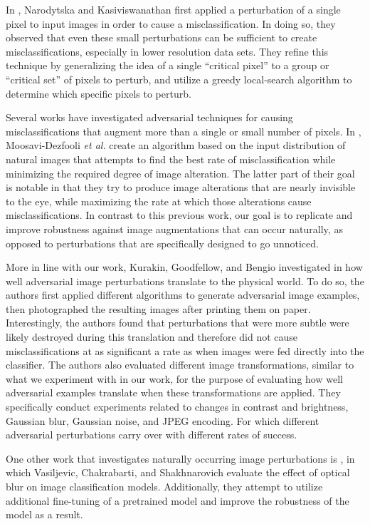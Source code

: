 \documentclass[conference]{IEEEtran}
\begin{document}
In \cite{simpleblackboxpert}, Narodytska and Kasiviswanathan first applied a perturbation of a single pixel to input images in order to cause a misclassification. In doing so, they observed that even these small perturbations can be sufficient to create misclassifications, especially in lower resolution data sets. They refine this technique by generalizing the idea of a single “critical pixel” to a group or “critical set” of pixels to perturb, and utilize a greedy local-search algorithm to determine which specific pixels to perturb.

Several works have investigated adversarial techniques for causing misclassifications that augment more than a single or small number of pixels. In \cite{universaladvpert}, Moosavi-Dezfooli {\it et al.} create an algorithm based on the input distribution of natural images that attempts to find the best rate of misclassification while minimizing the required degree of image alteration. The latter part of their goal is notable in that they try to produce image alterations that are nearly invisible to the eye, while maximizing the rate at which those alterations cause misclassifications. In contrast to this previous work, our goal is to replicate and improve robustness against image augmentations that can occur naturally, as opposed to perturbations that are specifically designed to go unnoticed.

More in line with our work, Kurakin, Goodfellow, and Bengio investigated in \cite{adversarialexamplesworld} how well adversarial image perturbations translate to the physical world. To do so, the authors first applied different algorithms to generate adversarial image examples, then photographed the resulting images after printing them on paper. Interestingly, the authors found that perturbations that were more subtle were likely destroyed during this translation and therefore did not cause misclassifications at as significant a rate as when images were fed directly into the classifier. The authors also evaluated different image transformations, similar to what we experiment with in our work, for the purpose of evaluating how well adversarial examples translate when these transformations are applied. They specifically conduct experiments related to changes in contrast and brightness, Gaussian blur, Gaussian noise, and JPEG encoding. For which different adversarial perturbations carry over with different rates of success.

One other work that investigates naturally occurring image perturbations is \cite{cnnblur}, in which Vasiljevic, Chakrabarti, and Shakhnarovich evaluate the effect of optical blur on image classification models. Additionally, they attempt to utilize additional fine-tuning of a pretrained model and improve the robustness of the model as a result.
\end{document}

